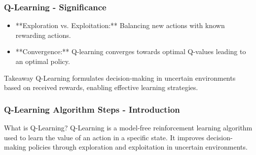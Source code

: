 \documentclass[aspectratio=169]{beamer}
\begin{document}
\begin{frame}[fragile]
    \frametitle{Q-Learning - Significance}
    \begin{itemize}
        \item **Exploration vs. Exploitation:** Balancing new actions with known rewarding actions.
        \item **Convergence:** Q-learning converges towards optimal Q-values leading to an optimal policy.
    \end{itemize}
    \begin{block}{Takeaway}
        Q-Learning formulates decision-making in uncertain environments based on received rewards, enabling effective learning strategies.
    \end{block}
\end{frame}

\begin{frame}[fragile]
    \frametitle{Q-Learning Algorithm Steps - Introduction}
    \begin{block}{What is Q-Learning?}
        Q-Learning is a model-free reinforcement learning algorithm used to learn the value of an action in a specific state. It improves decision-making policies through exploration and exploitation in uncertain environments.
    \end{block}
\end{frame}
\end{document}
